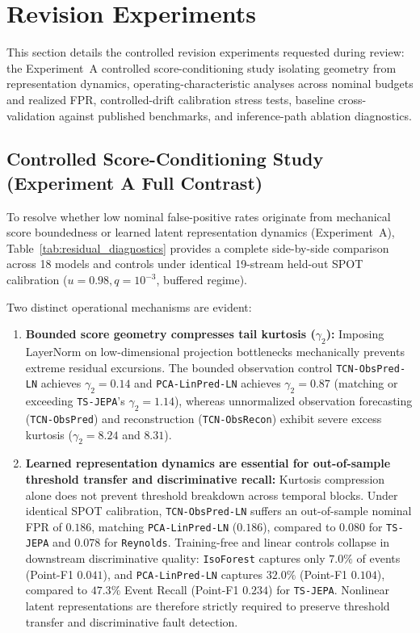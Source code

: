 \section{Revision Experiments}\label{sup:revision_experiments}

This section details the controlled revision experiments requested during review: the Experiment~A controlled score-conditioning study isolating geometry from representation dynamics, operating-characteristic analyses across nominal budgets and realized FPR, controlled-drift calibration stress tests, baseline cross-validation against published benchmarks, and inference-path ablation diagnostics.

\subsection{Controlled Score-Conditioning Study (Experiment A Full Contrast)}
To resolve whether low nominal false-positive rates originate from mechanical score boundedness or learned latent representation dynamics (Experiment~A), Table~\ref{tab:residual_diagnostics} provides a complete side-by-side comparison across 18 models and controls under identical 19-stream held-out SPOT calibration ($u=0.98, q=10^{-3}$, buffered regime).

Two distinct operational mechanisms are evident:
\begin{enumerate}
    \item \textbf{Bounded score geometry compresses tail kurtosis ($\gamma_2$):} Imposing LayerNorm on low-dimensional projection bottlenecks mechanically prevents extreme residual excursions. The bounded observation control \texttt{TCN-ObsPred-LN} achieves $\gamma_2 = 0.14$ and \texttt{PCA-LinPred-LN} achieves $\gamma_2 = 0.87$ (matching or exceeding \texttt{TS-JEPA}'s $\gamma_2 = 1.14$), whereas unnormalized observation forecasting (\texttt{TCN-ObsPred}) and reconstruction (\texttt{TCN-ObsRecon}) exhibit severe excess kurtosis ($\gamma_2 = 8.24$ and $8.31$).
    \item \textbf{Learned representation dynamics are essential for out-of-sample threshold transfer and discriminative recall:} Kurtosis compression alone does not prevent threshold breakdown across temporal blocks. Under identical SPOT calibration, \texttt{TCN-ObsPred-LN} suffers an out-of-sample nominal FPR of $0.186$, matching \texttt{PCA-LinPred-LN} ($0.186$), compared to $0.080$ for \texttt{TS-JEPA} and $0.078$ for \texttt{Reynolds}. Training-free and linear controls collapse in downstream discriminative quality: \texttt{IsoForest} captures only $7.0\%$ of events (Point-F1 $0.041$), and \texttt{PCA-LinPred-LN} captures $32.0\%$ (Point-F1 $0.104$), compared to $47.3\%$ Event Recall (Point-F1 $0.234$) for \texttt{TS-JEPA}. Nonlinear latent representations are therefore strictly required to preserve threshold transfer and discriminative fault detection.
\end{enumerate}

